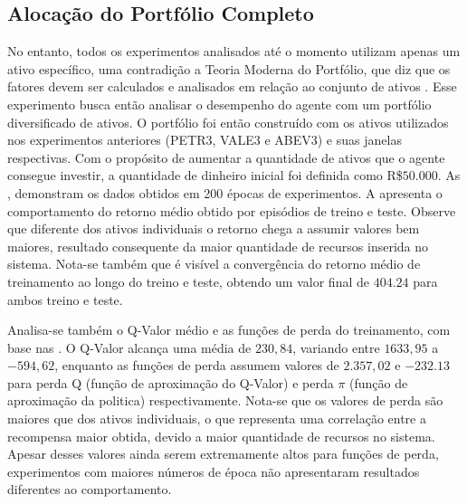 \subsection{Alocação do Portfólio Completo}

No entanto, todos os experimentos analisados até o momento utilizam apenas um ativo específico, uma contradição a Teoria Moderna do Portfólio, que diz que os fatores devem ser calculados e analisados em relação ao conjunto de ativos \cite{markowitz}. Esse experimento busca então analisar o desempenho do agente com um portfólio diversificado de ativos. O portfólio foi então construído com os ativos utilizados nos experimentos anteriores (PETR3, VALE3 e ABEV3) e suas janelas respectivas. Com o propósito de aumentar a quantidade de ativos que o agente consegue investir, a quantidade de dinheiro inicial foi definida como R\$$50.000$. As , demonstram os dados obtidos em 200 épocas de experimentos. A  apresenta o comportamento do retorno médio obtido por episódios de treino e teste. Observe que diferente dos ativos individuais o retorno chega a assumir valores bem maiores, resultado consequente da maior quantidade de recursos inserida no sistema. Nota-se também que é visível a convergência do retorno médio de treinamento ao longo do treino e teste, obtendo um valor final de $404.24$ para ambos treino e teste.


Analisa-se também o Q-Valor médio e as funções de perda do treinamento, com base nas . O Q-Valor alcança uma média de $230,84$, variando entre $1633,95$ a $-594,62$, enquanto as funções de perda assumem valores de $2.357,02$ e $-232.13$ para perda Q (função de aproximação do Q-Valor) e perda $\pi$ (função de aproximação da politica) respectivamente. Nota-se que os valores de perda são maiores que dos ativos individuais, o que representa uma correlação entre a recompensa maior obtida, devido a maior quantidade de recursos no sistema. Apesar desses valores ainda serem extremamente altos para funções de perda, experimentos com maiores números de época não apresentaram resultados diferentes ao comportamento.

